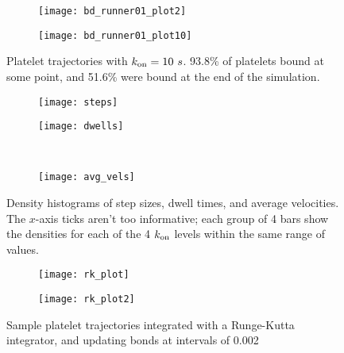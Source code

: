 \documentclass{article}
\newcommand{\tn}{\textnormal}
\begin{document}
\begin{figure}
  \centering
  \begin{subfigure}{0.49\textwidth}
    \texttt{[image: bd\_runner01\_plot2]}
  \end{subfigure}
  \hfill
  \begin{subfigure}{0.49\textwidth}
    \texttt{[image: bd\_runner01\_plot10]}
  \end{subfigure}  
  \caption{Platelet trajectories with $k_\tn{on} = 10 \ s$. 93.8\% of
    platelets bound at some point, and 51.6\% were bound at the end of
    the simulation.}
  \label{fig:traj14}
\end{figure}

\begin{figure}
  \centering
  \begin{subfigure}{0.49\textwidth}
    \texttt{[image: steps]}
  \end{subfigure}
  \hfill
 \begin{subfigure}{0.49\textwidth}
   \texttt{[image: dwells]}
 \end{subfigure}
 \\
 \begin{subfigure}{0.49\textwidth}
   \texttt{[image: avg\_vels]}
 \end{subfigure}
  \caption{Density histograms of step sizes, dwell times, and average
    velocities. The $x$-axis ticks aren't too informative; each group
    of 4 bars show the densities for each of the 4 $k_\tn{on}$ levels
    within the same range of values.} 
  \label{fig:other-data}
\end{figure}

\begin{figure}[h]
  \centering
  \begin{subfigure}{0.49\textwidth}
    \texttt{[image: rk\_plot]}
  \end{subfigure}
  \hfill
  \begin{subfigure}{0.49\textwidth}
    \texttt{[image: rk\_plot2]}
  \end{subfigure}
  \caption{Sample platelet trajectories integrated with a Runge-Kutta
    integrator, and updating bonds at intervals of 0.002}
  \label{fig:traj03}
\end{figure}



\end{document}
